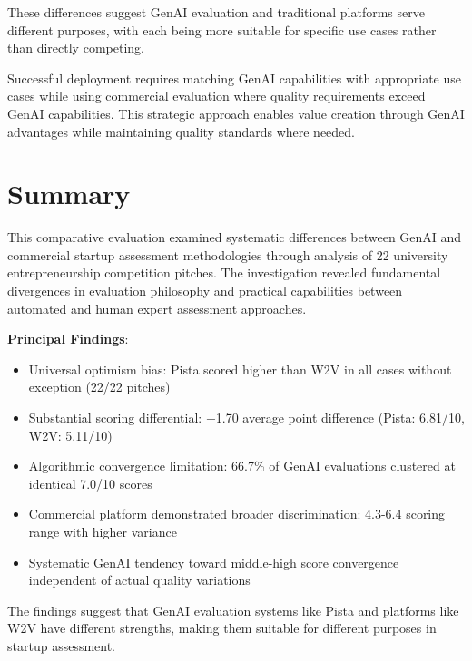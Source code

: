 These differences suggest GenAI evaluation and traditional platforms serve different purposes, with each being more suitable for specific use cases rather than directly competing.

Successful deployment requires matching GenAI capabilities with appropriate use cases while using commercial evaluation where quality requirements exceed GenAI capabilities. This strategic approach enables value creation through GenAI advantages while maintaining quality standards where needed.

\section{Summary}
\label{sec:summary}

This comparative evaluation examined systematic differences between GenAI and commercial startup assessment methodologies through analysis of 22 university entrepreneurship competition pitches. The investigation revealed fundamental divergences in evaluation philosophy and practical capabilities between automated and human expert assessment approaches.

\textbf{Principal Findings}:
\begin{itemize}
    \item Universal optimism bias: Pista scored higher than W2V in all cases without exception (22/22 pitches)
    \item Substantial scoring differential: +1.70 average point difference (Pista: 6.81/10, W2V: 5.11/10)
    \item Algorithmic convergence limitation: 66.7\% of GenAI evaluations clustered at identical 7.0/10 scores
    \item Commercial platform demonstrated broader discrimination: 4.3-6.4 scoring range with higher variance
    \item Systematic GenAI tendency toward middle-high score convergence independent of actual quality variations
\end{itemize}

The findings suggest that GenAI evaluation systems like Pista and platforms like W2V have different strengths, making them suitable for different purposes in startup assessment.
